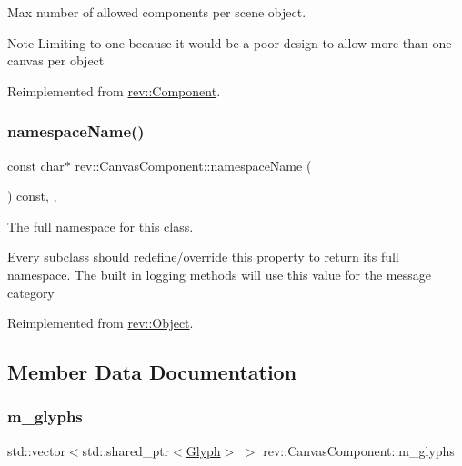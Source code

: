 Max number of allowed components per scene object. 

\begin{DoxyNote}{Note}
Limiting to one because it would be a poor design to allow more than one canvas per object 
\end{DoxyNote}


Reimplemented from \mbox{\hyperlink{classrev_1_1_component_afb80a97b6b36368c88a47e5f3cd3ed2f}{rev\+::\+Component}}.

\mbox{\label{classrev_1_1_canvas_component_aecd2d20165561426ae2eb73226626945}} 
\subsubsection{\texorpdfstring{namespaceName()}{namespaceName()}}
{\footnotesize\ttfamily const char$\ast$ rev\+::\+Canvas\+Component\+::namespace\+Name (\begin{DoxyParamCaption}{ }\end{DoxyParamCaption}) const\hspace{0.3cm}{\ttfamily [inline]}, {\ttfamily [override]}, {\ttfamily [virtual]}}



The full namespace for this class. 

Every subclass should redefine/override this property to return its full namespace. The built in logging methods will use this value for the message category 

Reimplemented from \mbox{\hyperlink{classrev_1_1_object_aaeb638d3e10f361c56c211a318a27f3d}{rev\+::\+Object}}.



\subsection{Member Data Documentation}
\mbox{\label{classrev_1_1_canvas_component_a3f46cf00013223f6b45b9b3403b7b8de}} 
\subsubsection{\texorpdfstring{m\_glyphs}{m\_glyphs}}
{\footnotesize\ttfamily std\+::vector$<$std\+::shared\+\_\+ptr$<$\mbox{\hyperlink{classrev_1_1_glyph}{Glyph}}$>$ $>$ rev\+::\+Canvas\+Component\+::m\+\_\+glyphs\hspace{0.3cm}{\ttfamily [protected]}}



